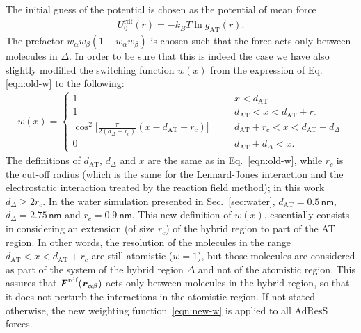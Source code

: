 \documentclass[aps,prb,preprint,citeautoscript]{revtex4}
\newcommand{\recheck}[1]{{\color{black} #1}}
\newcommand{\redc}[1]{{\color{black} #1}}
\renewcommand{\v}[1]{\textbf{\textit{#1}}}
\begin{document}
The initial guess of the potential is chosen as the
potential of mean force
\begin{align}\label{eqn:pmf}
  U^{\textrm{rdf}}_0(r) = -k_BT \ln g_{\textrm{AT}}(r).
\end{align} 
The prefactor $ w_\alpha w_\beta (1-w_\alpha w_\beta)$ is chosen such that the force acts only between molecules in $\Delta$. In order to be sure that this is indeed the case we have also slightly modified the switching function $w(x)$ from the expression of Eq.\ref{eqn:old-w} to the following:
\begin{align}\label{eqn:new-w}
  w(x) =
  \left\{
    \begin{array}{lcl}
      1 &\quad& x < d_{\textrm{AT}}\\
      1  && d_{\textrm{AT}} < x < d_{\textrm{AT}} + r_c\\
      \cos^2\big[\frac{\pi}{2(d_{{\Delta}} - r_c)} (x - d_{\textrm{AT}} - r_c)\big] && d_{\textrm{AT}} + r_c < x < d_{\textrm{AT}} + d_{{\Delta}} \\
      0 && d_{\textrm{AT}} + d_{{\Delta}}  < x.
    \end{array}
  \right.
\end{align}
The definitions of $d_{\textrm{AT}}$, $d_{{\Delta}}$ and $x$ are the
same as in Eq.~\eqref{eqn:old-w}, while $r_c$ is the cut-off radius
(which is the same for the Lennard-Jones interaction and the
electrostatic interaction treated by the reaction field method); in
this work $d_{{\Delta}} \geq 2r_c$. \redc{In the water simulation
  presented in Sec.~\ref{sec:water}, $d_{\textrm{AT}} = 0.5\,
  \textsf{nm}$, $d_{\Delta} = 2.75\, \textsf{nm}$ and $r_c = 0.9\
  \textsf{nm}$.}
This new definition of $w(x)$, essentially consists
in considering an extension (of size $r_c$) of the hybrid region to
part of the AT region.
\redc{
In other words, the resolution of the molecules in the range
$d_{\textrm{AT}} < x < d_{\textrm{AT}} + r_c$ are still atomistic
($w=1$), but those molecules are considered as part of the system of
the hybrid region $\Delta$ and not of the atomistic region.
This assures that $\v
F^{\textrm{rdf}}(\v r_{\alpha\beta})$ acts only between molecules
in the hybrid region, so that it does not perturb the interactions
in the atomistic region.}
\recheck{If not stated
  otherwise, the new weighting function~\eqref{eqn:new-w} is applied
  to all AdResS forces.}
\end{document}
